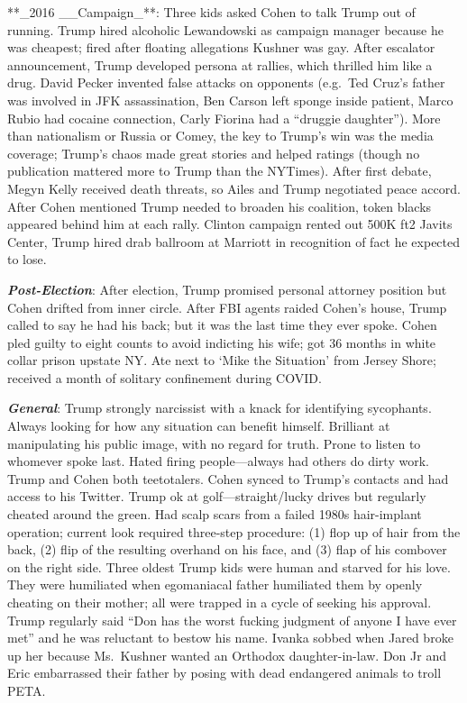 \documentclass[
]{article}
\begin{document}
**\_2016 \_\_Campaign\_**: Three kids asked Cohen to talk Trump out of
running. Trump hired alcoholic Lewandowski as campaign manager because
he was cheapest; fired after floating allegations Kushner was gay. After
escalator announcement, Trump developed persona at rallies, which
thrilled him like a drug. David Pecker invented false attacks on
opponents (e.g.~Ted Cruz's father was involved in JFK assassination, Ben
Carson left sponge inside patient, Marco Rubio had cocaine connection,
Carly Fiorina had a ``druggie daughter''). More than nationalism or
Russia or Comey, the key to Trump's win was the media coverage; Trump's
chaos made great stories and helped ratings (though no publication
mattered more to Trump than the NYTimes). After first debate, Megyn
Kelly received death threats, so Ailes and Trump negotiated peace
accord. After Cohen mentioned Trump needed to broaden his coalition,
token blacks appeared behind him at each rally. Clinton campaign rented
out 500K ft2 Javits Center, Trump hired drab ballroom at Marriott in
recognition of fact he expected to lose.

\textbf{\emph{Post-Election}}: After election, Trump promised personal
attorney position but Cohen drifted from inner circle. After FBI agents
raided Cohen's house, Trump called to say he had his back; but it was
the last time they ever spoke. Cohen pled guilty to eight counts to
avoid indicting his wife; got 36 months in white collar prison upstate
NY. Ate next to `Mike the Situation' from Jersey Shore; received a month
of solitary confinement during COVID.

\textbf{\emph{General}}: Trump strongly narcissist with a knack for
identifying sycophants. Always looking for how any situation can benefit
himself. Brilliant at manipulating his public image, with no regard for
truth. Prone to listen to whomever spoke last. Hated firing
people---always had others do dirty work. Trump and Cohen both
teetotalers. Cohen synced to Trump's contacts and had access to his
Twitter. Trump ok at golf---straight/lucky drives but regularly cheated
around the green. Had scalp scars from a failed 1980s hair-implant
operation; current look required three-step procedure: (1) flop up of
hair from the back, (2) flip of the resulting overhand on his face, and
(3) flap of his combover on the right side. Three oldest Trump kids were
human and starved for his love. They were humiliated when egomaniacal
father humiliated them by openly cheating on their mother; all were
trapped in a cycle of seeking his approval. Trump regularly said ``Don
has the worst fucking judgment of anyone I have ever met'' and he was
reluctant to bestow his name. Ivanka sobbed when Jared broke up her
because Ms.~Kushner wanted an Orthodox daughter-in-law. Don Jr and Eric
embarrassed their father by posing with dead endangered animals to troll
PETA.
\end{document}
